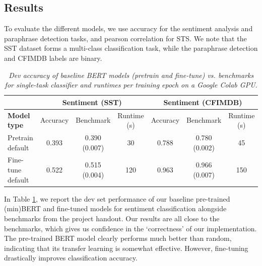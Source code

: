 \documentclass{article}
\begin{document}
\subsection{Results}
To evaluate the different models, we use accuracy for the sentiment analysis and paraphrase detection tasks, and pearson correlation for STS. We note that the SST dataset forms a multi-class classification task, while the paraphrase detection and CFIMDB labels are binary. 
\vspace{-0.4cm}
\begin{table}[h]
\footnotesize
\centering
\caption{\textit{Dev accuracy of baseline BERT models (pretrain and fine-tune) vs. benchmarks for single-task classifier and runtimes per training epoch on a Google Colab GPU.}}
\begin{tabular}{|l|ccc|ccc|}
\hline
  & \multicolumn{3}{c|}{\textbf{Sentiment (SST)}} & \multicolumn{3}{c|}{\textbf{Sentiment (CFIMDB)}} \\ \hline
\textbf{Model type}       & Accuracy       & Benchmark & Runtime (s)          & Accuracy        & Benchmark & Runtime (s)           \\ \hline
Pretrain default & 0.393           & 0.390 (0.007) & 30    & 0.788            & 0.780 (0.002)  & 45     \\
Fine-tune default & 0.522           & 0.515 (0.004) & 120    & 0.963            & 0.966 (0.007) & 150      \\ \hline
\end{tabular}
\label{tab: single}
\end{table}

In Table \ref{tab: single}, we report the dev set performance of our baseline pre-trained (min)BERT and fine-tuned models for sentiment classification alongside benchmarks from the project handout. Our results are all close to the benchmarks, which gives us confidence in the `correctness' of our implementation. The pre-trained BERT model clearly performs much better than random, indicating that its transfer learning is somewhat effective. However, fine-tuning drastically improves classification accuracy.
\end{document}
